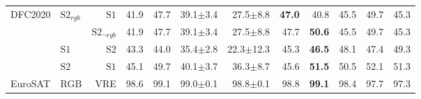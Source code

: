 \begin{tabular}{llr | r r r r r r r r r}
  \midrule
  \multirow{4}{*}{DFC2020} & \multirow{2}{*}{$\mathrm{S2}_{rgb}$} & $\mathrm{S1}$ & 41.9 & 47.7 & 39.1$\pm$3.4 & 27.5$\pm$8.8 & \textbf{47.0} & 40.8 & 45.5 & 49.7 & 45.3 \\
   &  & $\mathrm{S2}_{\neg rgb}$ & 41.9 & 47.7 & 39.1$\pm$3.4 & 27.5$\pm$8.8 & 47.7 & \textbf{50.6} & 45.5 & 49.7 & 45.3 \\
   & $\mathrm{S1}$ & $\mathrm{S2}$ & 43.3 & 44.0 & 35.4$\pm$2.8 & 22.3$\pm$12.3 & 45.3 & \textbf{46.5} & 48.1 & 47.4 & 49.3 \\
   & $\mathrm{S2}$ & $\mathrm{S1}$ & 45.1 & 49.7 & 40.1$\pm$3.7 & 36.3$\pm$8.7 & 45.6 & \textbf{51.5} & 50.5 & 52.1 & 51.3 \\
  \midrule
  EuroSAT & RGB & VRE & 98.6 & 99.1 & 99.0$\pm$0.1 & 98.8$\pm$0.1 & 98.8 & \textbf{99.1} & 98.4 & 97.7 & 97.3 \\
\bottomrule
\end{tabular}

\bigskip

